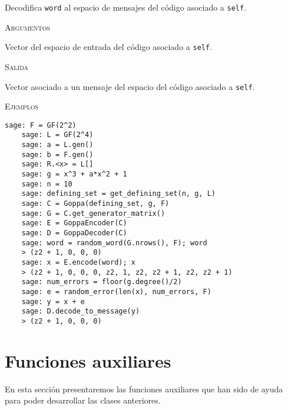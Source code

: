 \begin{description}[leftmargin=1em, font=\normalfont\ttfamily, style=nextline]
\begin{description}[font=\ttfamily, style=nextline]
  \item[decode\_to\_message(self, word)] Decodifica \texttt{word} al espacio de mensajes del código asociado a \texttt{self}.
      
  \textsc{Argumentos}
  \begin{description}[font=\normalfont\ttfamily]
      \item[word] Vector del espacio de entrada del código asociado a \texttt{self}.
  \end{description}

  \textsc{Salida}
  \begin{description}[font=\normalfont\ttfamily]
      \item[] Vector asociado a un mensaje del espacio del código asociado a \texttt{self}.
  \end{description}

  \textsc{Ejemplos}
  \begin{lstlisting}[gobble=4]
    sage: F = GF(2^2)
    sage: L = GF(2^4)
    sage: a = L.gen()
    sage: b = F.gen()
    sage: R.<x> = L[]
    sage: g = x^3 + a*x^2 + 1
    sage: n = 10
    sage: defining_set = get_defining_set(n, g, L)
    sage: C = Goppa(defining_set, g, F)
    sage: G = C.get_generator_matrix()
    sage: E = GoppaEncoder(C)
    sage: D = GoppaDecoder(C)
    sage: word = random_word(G.nrows(), F); word
    > (z2 + 1, 0, 0, 0)
    sage: x = E.encode(word); x
    > (z2 + 1, 0, 0, 0, z2, 1, z2, z2 + 1, z2, z2 + 1)
    sage: num_errors = floor(g.degree()/2)
    sage: e = random_error(len(x), num_errors, F)
    sage: y = x + e
    sage: D.decode_to_message(y)
    > (z2 + 1, 0, 0, 0)
  \end{lstlisting}
  \end{description}
\end{description}

\section{Funciones auxiliares}

En esta sección presentaremos las funciones auxiliares que han sido de ayuda para poder desarrollar las clases anteriores.

